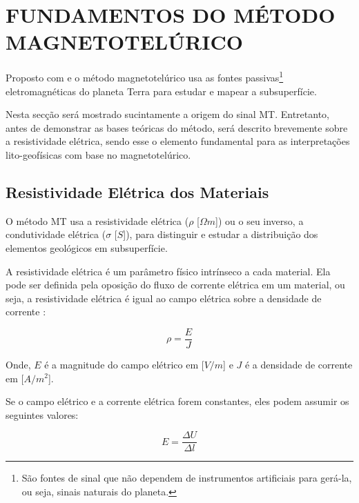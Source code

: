 \chapter{FUNDAMENTOS DO MÉTODO MAGNETOTELÚRICO}

    Proposto com \cite{tikhonov1950determining} e \cite{cagniard1953basic} o método magnetotelúrico usa as fontes passivas\footnote{São fontes de sinal que não dependem de instrumentos artificiais para gerá-la, ou seja, sinais naturais do planeta.} eletromagnéticas do planeta Terra para estudar e mapear a subsuperfície.
    
    Nesta secção será mostrado sucintamente a origem do sinal MT. Entretanto, antes de demonstrar as bases teóricas do método, será descrito brevemente sobre a resistividade elétrica, sendo esse o elemento fundamental para as interpretações lito-geofísicas com base no magnetotelúrico.
        

    \section{Resistividade Elétrica dos Materiais}
    
        
        O método MT usa a resistividade elétrica ($\rho$ [$\Omega m$]) ou o seu inverso, a condutividade elétrica ($\sigma$ [$S$]), para distinguir e estudar a distribuição dos elementos geológicos em subsuperfície. 
        
        A resistividade elétrica é um parâmetro físico intrínseco a cada material. Ela pode ser definida pela oposição do fluxo de corrente elétrica em um material, ou seja, a resistividade elétrica é igual ao campo elétrica sobre a densidade de corrente \cite{eletromag8hayt}:
        
        \begin{equation}
            \label{resis-antes}
            \rho = \dfrac{E}{J}
        \end{equation}

        \noindent Onde, $E$ é a magnitude do campo elétrico em [$V/m$] e $J$ é a densidade de corrente em [$A/m^2$].
        
        Se o campo elétrico e a corrente elétrica forem constantes, eles podem assumir os seguintes valores:
        
        \begin{equation}
            \label{campo-eletrico}
            E = \frac{\Delta U}{\Delta l}
        \end{equation}
        
